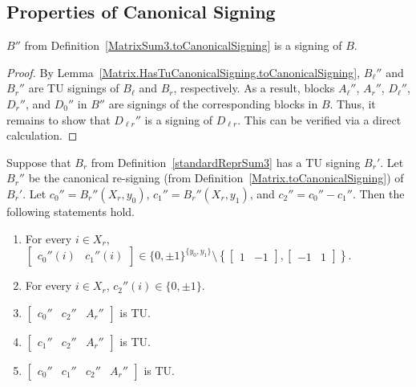 \subsection{Properties of Canonical Signing}

\begin{lemma}
    \label{MatrixSum3.HasCanonicalSigning.toCanonicalSigning}
    \leanok
    $B''$ from Definition~\ref{MatrixSum3.toCanonicalSigning} is a signing of $B$.
\end{lemma}

\begin{proof}
    \leanok
    By Lemma~\ref{Matrix.HasTuCanonicalSigning.toCanonicalSigning}, $B_{\ell}''$ and $B_{r}''$ are TU signings of $B_{\ell}$ and $B_{r}$, respectively. As a result, blocks $A_{\ell}''$, $A_{r}''$, $D_{\ell}''$, $D_{r}''$, and $D_{0}''$ in $B''$ are signings of the corresponding blocks in $B$. Thus, it remains to show that $D_{\ell r}''$ is a signing of $D_{\ell r}$. This can be verified via a direct calculation.
\end{proof}

\begin{lemma}
    \label{MatrixSum3.HasTuBr.cccAr_isTotallyUnimodular}
    \leanok
    Suppose that $B_{r}$ from Definition~\ref{standardReprSum3} has a TU signing $B_{r}'$. Let $B_{r}''$ be the canonical re-signing (from Definition~\ref{Matrix.toCanonicalSigning}) of $B_{r}'$. Let $c_{0}'' = B_{r}'' (X_{r}, y_{0})$, $c_{1}'' = B_{r}'' (X_{r}, y_{1})$, and $c_{2}'' = c_{0}'' - c_{1}''$. Then the following statements hold.
    \begin{enumerate}
        \item\label{item:tss_Brp_c01} For every $i \in X_{r}$, $\begin{bmatrix} c_{0}'' (i) & c_{1}'' (i) \end{bmatrix} \in \{0, \pm 1\}^{\{y_{0}, y_{1}\}} \setminus \left\{ \begin{bmatrix} 1 & -1 \end{bmatrix}, \begin{bmatrix} -1 & 1 \end{bmatrix} \right\}$.
        \item\label{item:tss_Brp_c2} For every $i \in X_{r}$, $c_{2}'' (i) \in \{0, \pm 1\}$.
        \item\label{item:tss_Brp_tu1} $\begin{bmatrix} c_{0}'' & c_{2}'' & A_{r}'' \end{bmatrix}$ is TU.
        \item\label{item:tss_Brp_tu2} $\begin{bmatrix} c_{1}'' & c_{2}'' & A_{r}'' \end{bmatrix}$ is TU.
        \item\label{item:tss_Brp_tu3} $\begin{bmatrix} c_{0}'' & c_{1}'' & c_{2}'' & A_{r}'' \end{bmatrix}$ is TU.
    \end{enumerate}
\end{lemma}

